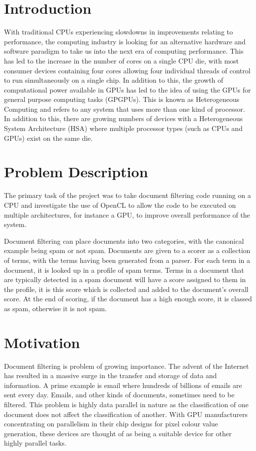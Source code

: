 \section{Introduction}

With traditional CPUs experiencing slowdowns in improvements relating to
performance, the computing industry is looking for an alternative hardware and
software paradigm to take us into the next era of computing performance. This
has led to the increase in the number of cores on a single CPU die, with most
consumer devices containing four cores allowing four individual threads of
control to run simultaneously on a single chip. In addition to this, the growth
of computational power available in GPUs has led to the idea of using the GPUs
for general purpose computing tasks (GPGPUs). This is known as Heterogeneous
Computing and refers to any system that uses more than one kind of processor. In
addition to this, there are growing numbers of devices with a Heterogeneous
System Architecture (HSA) where multiple processor types (such as CPUs and GPUs)
exist on the same die.

\section{Problem Description}

The primary task of the project was to take document filtering code running on a
CPU and investigate the use of OpenCL to allow the code to be executed on
multiple architectures, for instance a GPU, to improve overall performance of
the system.

Document filtering can place documents into two categories, with the canonical
example being spam or not spam. Documents are given to a scorer as a
collection of terms, with the terms having been generated from a parser. For
each term in a document, it is looked up in a profile of spam terms. Terms in a
document that are typically detected in a spam document will have a score
assigned to them in the profile, it is this score which is collected and added
to the document's overall score. At the end of scoring, if the document has a
high enough score, it is classed as spam, otherwise it is not spam.

\section{Motivation}

Document filtering is problem of growing importance. The advent of the Internet
has resulted in a massive surge in the transfer and storage of data and
information. A prime example is email where hundreds of billions of emails are
sent every day. Emails, and other kinds of documents, sometimes need to be
filtered. This problem is highly data parallel in nature as the classification
of one document does not affect the classification of another. With GPU
manufacturers concentrating on parallelism in their chip designs for pixel
colour value generation, these devices are thought of as being a suitable device
for other highly parallel tasks.

